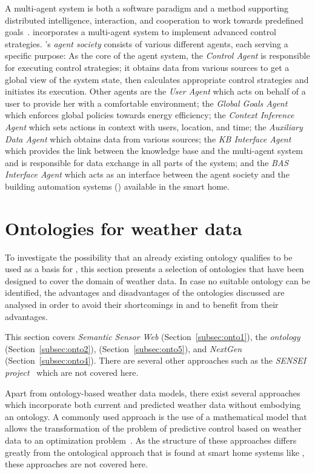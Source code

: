 A multi-agent system is both a software paradigm and a method supporting distributed intelligence, interaction, and cooperation to work towards predefined goals~\cite{MultiAgentSystems}. \thinkhome incorporates a multi-agent system to implement advanced control strategies. \thinkhome's \emph{agent society} consists of various different agents, each serving a specific purpose: As the core of the agent system, the \emph{Control Agent} is responsible for executing control strategies; it obtains data from various sources to get a global view of the system state, then calculates appropriate control strategies and initiates its execution. Other agents are the \emph{User Agent} which acts on behalf of a user to provide her with a comfortable environment; the \emph{Global Goals Agent} which enforces global policies towards energy efficiency; the \emph{Context Inference Agent} which sets actions in context with users, location, and time; the \emph{Auxiliary Data Agent} which obtains data from various sources;
the \emph{KB Interface Agent} which provides the link between the knowledge base and the multi-agent system and is responsible for data exchange in all parts of the system; and the \emph{BAS Interface Agent} which acts as an interface between the agent society and the building automation systems () available in the smart home.

\section{Ontologies for weather data}
\label{sec:weather_ontologies}

To investigate the possibility that an already existing ontology qualifies to be used as a basis for \smarthomeweather, this section presents a selection of ontologies that have been designed to cover the domain of weather data. In case no suitable ontology can be identified, the advantages and disadvantages of the ontologies discussed are analysed in order to avoid their shortcomings in \smarthomeweather and to benefit from their advantages.

This section covers \emph{Semantic Sensor Web} (Section~\ref{subsec:onto1}), the \emph{ ontology} (Section~\ref{subsec:onto2}), \emph{} (Section~\ref{subsec:onto5}), and \emph{NextGen} (Section~\ref{subsec:onto4}). There are several other approaches such as the \emph{SENSEI project}~\cite{sensei} which are not covered here.

Apart from ontology-based weather data models, there exist several approaches which incorporate both current and predicted weather data without embodying an ontology. A commonly used approach is the use of a mathematical model that allows the transformation of the problem of predictive control based on weather data to an optimization problem~\cite{NonOntologicalApproach1,NonOntologicalApproach2}. As the structure of these approaches differs greatly from the ontological approach that is found at smart home systems like \thinkhome, these approaches are not covered here.

